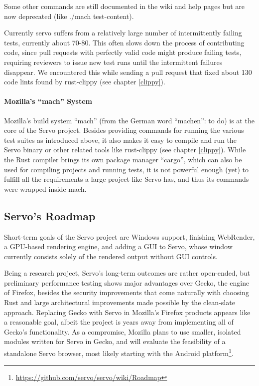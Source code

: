 \documentclass{scrartcl}
\begin{document}
Some other commands are still documented in the wiki and help pages but are now deprecated (like ./mach test-content).

Currently servo suffers from a relatively large number of intermittently failing tests, currently about 70-80. This often slows down the process of contributing code, since pull requests with perfectly valid code might produce failing tests, requiring reviewers to issue new test runs until the intermittent failures disappear. We encountered this while sending a pull request that fixed about 130 code lints found by rust-clippy (see chapter \ref{clippy}).


\paragraph{Mozilla's ``mach'' System}
Mozilla's build system ``mach'' (from the German word ``machen'': to do) is at the core of the Servo project. Besides providing commands for running the various test suites as introduced above, it also makes it easy to compile and run the Servo binary or other related tools like rust-clippy (see chapter \ref{clippy}). While the Rust compiler brings its own package manager ``cargo'', which can also be used for compiling projects and running tests, it is not powerful enough (yet) to fulfill all the requirements a large project like Servo has, and thus its commands were wrapped inside mach.


\subsection{Servo's Roadmap}
Short-term goals of the Servo project are Windows support, finishing WebRender, a GPU-based rendering engine, and adding a GUI to Servo, whose window currently consists solely of the rendered output without GUI controls.
 
Being a research project, Servo's long-term outcomes are rather open-ended, but preliminary performance testing shows major advantages over Gecko, the engine of Firefox, besides the security improvements that come naturally with choosing Rust and large architectural improvements made possible by the clean-slate approach. Replacing Gecko with Servo in Mozilla's Firefox products appears like a reasonable goal, albeit the project is years away from implementing all of Gecko's functionality. As a compromise, Mozilla plans to use smaller, isolated modules written for Servo in Gecko, and will evaluate the feasibility of a standalone Servo browser, most likely starting with the Android platform\footnote{\url{https://github.com/servo/servo/wiki/Roadmap}}.
\end{document}
